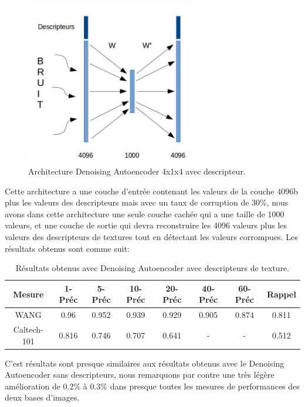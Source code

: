 \begin{figure}[H]
\centering
\includegraphics[width=3in]{Figures/ae/AE-Descripteur.jpg}
\caption[An Electron]{Architecture Denoising Autoencoder 4x1x4 avec descripteur.}
\label{fig:Electron}
\end{figure}

	Cette architecture a une couche d'entrée contenant les valeurs de la couche 4096b plus les valeurs des descripteurs mais avec un taux de corruption de 30\%, nous avons dans cette architecture une seule couche cachée qui a une taille de 1000 valeurs, et une couche de sortie qui devra reconstruire les 4096 valeurs plus les valeurs des descripteurs de textures tout en détectant les valeurs corrompues. Les résultats obtenus sont comme suit:

\begin{table}[H]
\begin{center}
\begin{tabular}{|c|c|c|c|c|c|c|c|}
\hline
	Mesure & 1-Préc & 5-Préc & 10-Préc & 20-Préc & 40-Préc & 60-Préc & Rappel\\
\hline
	WANG & 0.96 & 0.952 & 0.939 & 0.929 & 0.905 & 0.874 & 0.811\\
\hline
	Caltech-101 & 0.816 & 0.746 & 0.707 & 0.641 & - & - & 0.512\\
\hline
\end{tabular}
\end{center}
\caption{Résultats obtenus avec Denoising Autoencoder avec descripteurs de texture.}
\end{table}

	C'est résultats sont presque similaires aux résultats obtenus avec le Denoising Autoencoder sans descripteurs, nous remarquons par contre une très légère amélioration de 0.2\% à 0.3\% dans presque toutes les mesures de performances des deux bases d'images.
	

